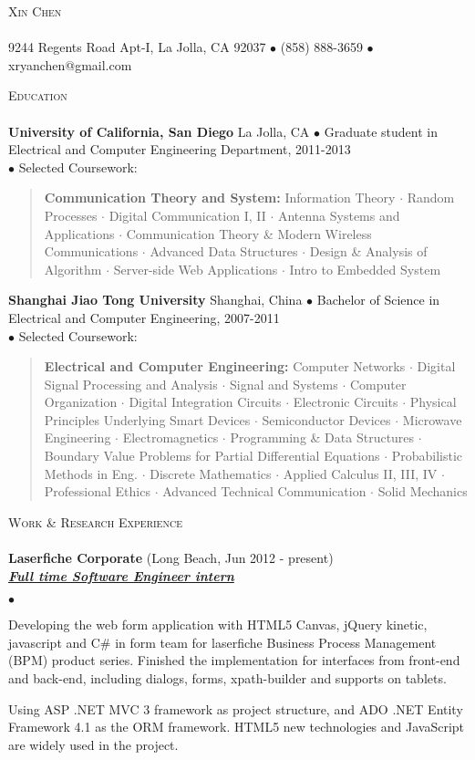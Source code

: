\documentclass{article}
\newcommand{\area}[2]{\vspace*{-9pt} \begin{verse}\textbf{#1}   #2 \end{verse}  }
\newcommand{\lineunder}{\vspace*{-8pt} \\ \hspace*{-18pt} \hrulefill \\}
\newcommand{\header}[1]{{\hspace*{-15pt}\vspace*{6pt} \textsc{#1}} \vspace*{-6pt} \lineunder}
\newcommand{\employer}[3]{{ \textbf{#1} (#2)\\ \underline{\textbf{\emph{#3}}}\\  }}
\newcommand{\contact}[2]{
\vspace*{-8pt}
\begin{center}
{\LARGE \scshape {#1}}
\lineunder 
#2
\end{center}
\vspace*{-8pt}
}
\newenvironment{achievements}{\begin{list}{$\bullet$}{\topsep 0pt \itemsep -2pt}}{\vspace*{4pt}\end{list}}
\newcommand{\schoolwithcourses}[4]{
 \textbf{#1} #2 $\bullet$ #3\\ 
#4\\
\vspace*{5pt}
}
\begin{document}
\small
\smallskip
\vspace*{-95pt}

\contact{Xin Chen}
{9244 Regents Road Apt-I, La Jolla, CA 92037 $\bullet$ (858) 888-3659 $\bullet$ xryanchen@gmail.com}

\header{Education}

\schoolwithcourses{University of California, San Diego}{La Jolla, CA}{Graduate student in Electrical and Computer Engineering Department, 2011-2013}
{$\bullet$ Selected Coursework:}
	\area{Communication Theory and System:}{ Information Theory $\cdot$ Random Processes $\cdot$ Digital Communication I, II $\cdot$ Antenna Systems
	      and Applications $\cdot$ Communication Theory \& Modern Wireless Communications $\cdot$ Advanced Data Structures $\cdot$ Design \& Analysis of Algorithm $\cdot$ Server-side Web Applications $\cdot$ Intro to Embedded System}

\schoolwithcourses{Shanghai Jiao Tong University}{Shanghai, China}{Bachelor of Science in Electrical and Computer Engineering, 2007-2011}
{$\bullet$ Selected Coursework:}
	\area{Electrical and Computer Engineering:}{ Computer Networks $\cdot$ Digital Signal Processing and Analysis 
	      $\cdot$ Signal and Systems $\cdot$ Computer Organization $\cdot$ Digital Integration Circuits $\cdot$ Electronic Circuits $\cdot$ 
	      Physical Principles Underlying Smart Devices $\cdot$ Semiconductor Devices $\cdot$ Microwave Engineering 
	      $\cdot$ Electromagnetics $\cdot$ Programming \& Data Structures $\cdot$ Boundary Value Problems for Partial Differential Equations $\cdot$ Probabilistic Methods in Eng. $\cdot$ Discrete Mathematics $\cdot$ Applied Calculus II, III, IV $\cdot$ Professional Ethics $\cdot$ Advanced Technical Communication $\cdot$ Solid Mechanics}

\header{Work \& Research Experience}
\employer{Laserfiche Corporate}{Long Beach, Jun 2012 - present}{Full time Software Engineer intern}
	\begin{achievements}
	\item Developing the web form application with HTML5 Canvas, jQuery kinetic, javascript and C\# in form team for laserfiche Business Process Management (BPM) product series. Finished the implementation for interfaces from front-end and back-end, including dialogs, forms, xpath-builder and supports on tablets.
	\item Using ASP .NET MVC 3 framework as project structure, and ADO .NET Entity Framework 4.1 as the ORM framework. HTML5 new technologies and 				JavaScript are widely used in the project.
	\end{achievements}
\end{document}
